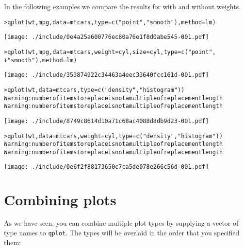 In the following examples we compare the results for with and without weights.

\begin{alltt}
> qplot(wt, mpg, data = mtcars, type = c("point", "smooth"), method = lm)
\end{alltt}
\texttt{[image: ./include/0e4a25a600776ec80a76e1f8d0abe545-001.pdf]}
\begin{alltt}

> qplot(wt, mpg, data = mtcars, weight = cyl, size = cyl, type = c("point", 
+     "smooth"), method = lm)
\end{alltt}
\texttt{[image: ./include/353874922c34463a4eec33640fcc161d-001.pdf]}
\begin{alltt}

> qplot(wt, data = mtcars, type = c("density", "histogram"))
Warning:  number of items to replace is not a multiple of replacement length 
Warning:  number of items to replace is not a multiple of replacement length 
\end{alltt}
\texttt{[image: ./include/8749c8614d10a71c68ac4088d8db9d23-001.pdf]}
\begin{alltt}

> qplot(wt, data = mtcars, weight = cyl, type = c("density", "histogram"))
Warning:  number of items to replace is not a multiple of replacement length 
Warning:  number of items to replace is not a multiple of replacement length 
\end{alltt}
\texttt{[image: ./include/0e6f2f88173650c7ca5de078e266c56d-001.pdf]}
\begin{alltt}

\end{alltt}%

\section{Combining plots}\label{sec:combining_plots}

As we have seen, you can combine multiple plot types by supplying a vector of type names to {\tt qplot}.  The types will be overlaid in the order that you specified them:

